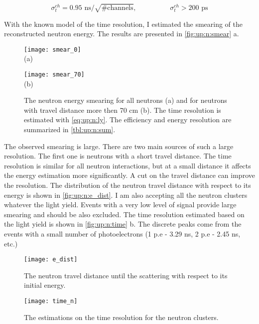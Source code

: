 \documentclass[main.tex]{subfiles}
\begin{document}
\begin{equation}
\label{eq:up:n:ch}
	\sigma^{ch}_t=0.95\text{ ns}/\sqrt{\text{\#channels}}, \hspace{2cm} \sigma^{ch}_t>200\text{ ps}
\end{equation}

With the known model of the time resolution, I estimated the smearing of the reconstructed neutron energy. The results are presented in \autoref{fig:up:n:smear} a.

\begin{figure}[!ht]
	\centering
	\begin{minipage}{0.49\linewidth}
		\centering
		\texttt{[image: smear\_0]} \\ (a)
	\end{minipage}
	\begin{minipage}{0.49\linewidth}
		\centering
		\texttt{[image: smear\_70]} \\ (b)
	\end{minipage}
	\caption{The neutron energy smearing for all neutrons (a) and for neutrons with travel distance more then 70 cm (b). The time resolution is estimated with \autoref{eq:up:n:ly}. The efficiency and energy resolution are summarized in \autoref{tbl:up:n:sum}.}
	\label{fig:up:n:smear}
\end{figure}

The observed smearing is large. There are two main sources of such a large resolution. The first one is neutrons with a short travel distance. The time resolution is similar for all neutron interactions, but at a small distance it affects the energy estimation more significantly. A cut on the travel distance can improve the resolution. The distribution of the neutron travel distance with respect to its energy is shown in \autoref{fig:up:n:e_dist}. I am also accepting all the neutron clusters whatever the light yield. Events with a very low level of signal provide large smearing and should be also excluded. The time resolution estimated based on the light yield is shown in \autoref{fig:up:n:time} b. The discrete peaks come from the events with a small number of photoelectrons (1 p.e - 3.29 ns, 2 p.e - 2.45 ns, etc.)

\begin{figure}[!ht]
	\centering
	\begin{minipage}{0.45\linewidth}
		\centering
		\texttt{[image: e\_dist]}
    \caption{The neutron travel distance until the scattering with respect to its initial energy.}
    \label{fig:up:n:e_dist}
	\end{minipage}
	\begin{minipage}{0.09\linewidth}
	\hspace{\linewidth}
	\end{minipage}
	\begin{minipage}{0.45\linewidth}
		\centering
		\texttt{[image: time\_n]}
    \caption{The estimations on the time resolution for the neutron clusters.}
    \label{fig:up:n:time}
	\end{minipage}
\end{figure}
\end{document}
